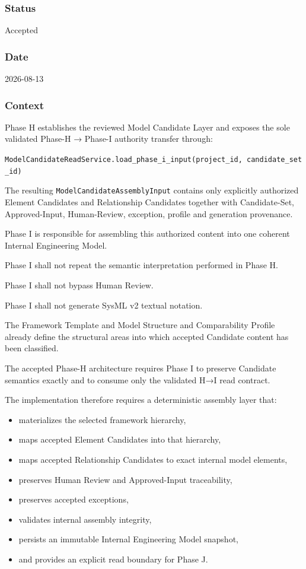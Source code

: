 \hypertarget{status-1}{%
\subsubsection{Status}\label{status-1}}

Accepted

\hypertarget{date-1}{%
\subsubsection{Date}\label{date-1}}

2026-08-13

\hypertarget{context-4}{%
\subsubsection{Context}\label{context-4}}

Phase H establishes the reviewed Model Candidate Layer and exposes the sole validated Phase-H → Phase-I authority transfer through:

\texttt{ModelCandidateReadService.load\_phase\_i\_input(project\_id,\ candidate\_set\_id)}

The resulting \texttt{ModelCandidateAssemblyInput} contains only explicitly authorized Element Candidates and Relationship Candidates together with Candidate-Set, Approved-Input, Human-Review, exception, profile and generation provenance.

Phase I is responsible for assembling this authorized content into one coherent Internal Engineering Model.

Phase I shall not repeat the semantic interpretation performed in Phase H.

Phase I shall not bypass Human Review.

Phase I shall not generate SysML v2 textual notation.

The Framework Template and Model Structure and Comparability Profile already define the structural areas into which accepted Candidate content has been classified.

The accepted Phase-H architecture requires Phase I to preserve Candidate semantics exactly and to consume only the validated H→I read contract.

The implementation therefore requires a deterministic assembly layer that:

\begin{itemize}
\tightlist
\item
  materializes the selected framework hierarchy,
\item
  maps accepted Element Candidates into that hierarchy,
\item
  maps accepted Relationship Candidates to exact internal model elements,
\item
  preserves Human Review and Approved-Input traceability,
\item
  preserves accepted exceptions,
\item
  validates internal assembly integrity,
\item
  persists an immutable Internal Engineering Model snapshot,
\item
  and provides an explicit read boundary for Phase J.
\end{itemize}

